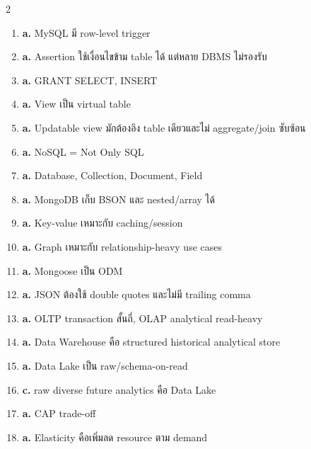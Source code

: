 \documentclass[a4paper,12pt]{article}
\newcommand{\ans}[1]{\textbf{#1}}
\begin{document}
\begin{multicols}{2}
\begin{enumerate}[label=\textbf{\arabic*.}]
    \item \ans{a.} MySQL มี row-level trigger
    \item \ans{a.} Assertion ใช้เงื่อนไขข้าม table ได้ แต่หลาย DBMS ไม่รองรับ
    \item \ans{a.} GRANT SELECT, INSERT
    \item \ans{a.} View เป็น virtual table
    \item \ans{a.} Updatable view มักต้องอิง table เดียวและไม่ aggregate/join ซับซ้อน
    \item \ans{a.} NoSQL = Not Only SQL
    \item \ans{a.} Database, Collection, Document, Field
    \item \ans{a.} MongoDB เก็บ BSON และ nested/array ได้
    \item \ans{a.} Key-value เหมาะกับ caching/session
    \item \ans{a.} Graph เหมาะกับ relationship-heavy use cases
    \item \ans{a.} Mongoose เป็น ODM
    \item \ans{a.} JSON ต้องใช้ double quotes และไม่มี trailing comma
    \item \ans{a.} OLTP transaction สั้นถี่, OLAP analytical read-heavy
    \item \ans{a.} Data Warehouse คือ structured historical analytical store
    \item \ans{a.} Data Lake เป็น raw/schema-on-read
    \item \ans{c.} raw diverse future analytics คือ Data Lake
    \item \ans{a.} CAP trade-off
    \item \ans{a.} Elasticity คือเพิ่มลด resource ตาม demand
\end{enumerate}
\end{multicols}

\newpage
\end{document}
